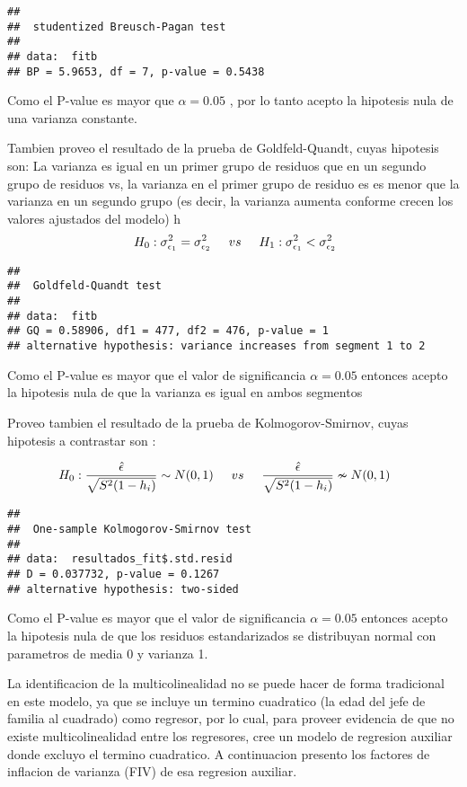 \documentclass[]{book}
\begin{document}
\begin{verbatim}
## 
##  studentized Breusch-Pagan test
## 
## data:  fitb
## BP = 5.9653, df = 7, p-value = 0.5438
\end{verbatim}

Como el P-value es mayor que \(\alpha = 0.05\) , por lo tanto acepto la
hipotesis nula de una varianza constante.

Tambien proveo el resultado de la prueba de Goldfeld-Quandt, cuyas
hipotesis son: La varianza es igual en un primer grupo de residuos que
en un segundo grupo de residuos vs, la varianza en el primer grupo de
residuo es es menor que la varianza en un segundo grupo (es decir, la
varianza aumenta conforme crecen los valores ajustados del modelo) h
\[ \ H_{0}: \sigma_{\epsilon_{1}}^{2} = \sigma_{\epsilon_{2}}^{2} \hspace{0.5cm} vs   \hspace{0.5cm} H_{1}: \sigma_{\epsilon_{1}}^{2} < \sigma_{\epsilon_{2}}^{2}\]

\begin{verbatim}
## 
##  Goldfeld-Quandt test
## 
## data:  fitb
## GQ = 0.58906, df1 = 477, df2 = 476, p-value = 1
## alternative hypothesis: variance increases from segment 1 to 2
\end{verbatim}

Como el P-value es mayor que el valor de significancia \(\alpha = 0.05\)
entonces acepto la hipotesis nula de que la varianza es igual en ambos
segmentos

Proveo tambien el resultado de la prueba de Kolmogorov-Smirnov, cuyas
hipotesis a contrastar son :

\[ H_{0}: \frac{\hat{\epsilon}}{\sqrt{S^{2}(1-h_{i})}} \sim N(0,1) \hspace{0.5cm} vs \hspace{0.5cm} \frac{\hat{\epsilon}}{\sqrt{S^{2}(1-h_{i})}} \nsim N(0,1) \hspace{0.5cm}  \]

\begin{verbatim}
## 
##  One-sample Kolmogorov-Smirnov test
## 
## data:  resultados_fit$.std.resid
## D = 0.037732, p-value = 0.1267
## alternative hypothesis: two-sided
\end{verbatim}

Como el P-value es mayor que el valor de significancia \(\alpha = 0.05\)
entonces acepto la hipotesis nula de que los residuos estandarizados se
distribuyan normal con parametros de media 0 y varianza 1.

La identificacion de la multicolinealidad no se puede hacer de forma
tradicional en este modelo, ya que se incluye un termino cuadratico (la
edad del jefe de familia al cuadrado) como regresor, por lo cual, para
proveer evidencia de que no existe multicolinealidad entre los
regresores, cree un modelo de regresion auxiliar donde excluyo el
termino cuadratico. A continuacion presento los factores de inflacion de
varianza (FIV) de esa regresion auxiliar.
\end{document}
